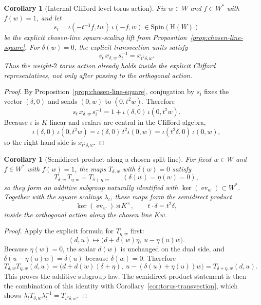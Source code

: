 \documentclass{birkjour}
\theoremstyle{plain}
\newtheorem{corollary}[theorem]{Corollary}
\theoremstyle{definition}
\theoremstyle{remark}
\numberwithin{equation}{section}
\newcommand{\Spin}{\mathrm{Spin}}
\newcommand{\Hyp}{\mathrm{H}}
\begin{document}
\begin{corollary}[Internal Clifford-level torus action]
\label{cor:internal-clifford-torus}
Fix $w\in W$ and $f\in W^*$ with $f(w)=1$, and let
\[
  s_t = \iota(-t^{-1}f,tw)\,\iota(-f,w)\in \Spin(\Hyp(W))
\]
be the explicit chosen-line square-scaling lift from
Proposition~\ref{prop:chosen-line-square}. For $\delta(w)=0$, the explicit
transvection units satisfy
\[
  s_t\,x_{\delta,w}\,s_t^{-1}=x_{t^2\delta,w}.
\]
Thus the weight-$2$ torus action already holds inside the explicit Clifford
representatives, not only after passing to the orthogonal action.
\end{corollary}

\begin{proof}
By Proposition~\ref{prop:chosen-line-square}, conjugation by $s_t$ fixes the
vector $(\delta,0)$ and sends $(0,w)$ to $(0,t^2w)$. Therefore
\[
  s_t\,x_{\delta,w}\,s_t^{-1}
  = 1 + \iota(\delta,0)\,\iota(0,t^2w).
\]
Because $\iota$ is $K$-linear and scalars are central in the Clifford algebra,
\[
  \iota(\delta,0)\,\iota(0,t^2w)
  = \iota(\delta,0)\,t^2\iota(0,w)
  = \iota(t^2\delta,0)\,\iota(0,w),
\]
so the right-hand side is $x_{t^2\delta,w}$.
\end{proof}

\begin{corollary}[Semidirect product along a chosen split line]
\label{cor:one-line-semidirect}
For fixed $w\in W$ and $f\in W^*$ with $f(w)=1$, the maps $T_{\delta,w}$ with
$\delta(w)=0$ satisfy
\[
  T_{\delta,w}\,T_{\eta,w}=T_{\delta+\eta,w}
  \qquad
  (\delta(w)=\eta(w)=0),
\]
so they form an additive subgroup naturally identified with
$\ker(\operatorname{ev}_w)\subset W^*$. Together with the square scalings
$\lambda_t$, these maps form the semidirect product
\[
  \ker(\operatorname{ev}_w)\rtimes K^\times,
  \qquad
  t\cdot \delta = t^2\delta,
\]
inside the orthogonal action along the chosen line $Kw$.
\end{corollary}

\begin{proof}
Apply the explicit formula for $T_{\eta,w}$ first:
\[
  (d,u)\longmapsto \bigl(d+d(w)\eta,\ u-\eta(u)w\bigr).
\]
Because $\eta(w)=0$, the scalar $d(w)$ is unchanged on the dual side, and
$\delta(u-\eta(u)w)=\delta(u)$ because $\delta(w)=0$. Therefore
\[
  T_{\delta,w}T_{\eta,w}(d,u)
  =
  \bigl(d+d(w)(\delta+\eta),\ u-(\delta(u)+\eta(u))w\bigr)
  =
  T_{\delta+\eta,w}(d,u).
\]
This proves the additive subgroup law. The semidirect-product statement is then
the combination of this identity with
Corollary~\ref{cor:torus-transvection}, which shows
$\lambda_t T_{\delta,w}\lambda_t^{-1}=T_{t^2\delta,w}$.
\end{proof}
\end{document}
